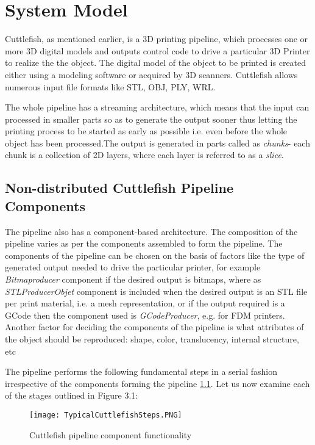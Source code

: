 \chapter{System Model}
Cuttlefish, as mentioned earlier, is a 3D printing pipeline, which processes one or more 3D digital models and outputs control code to drive a particular 3D Printer to realize the the object. The digital model of the object to be printed is created either using a modeling software or acquired by 3D scanners. Cuttlefish allows  numerous input file formats like STL, OBJ, PLY, WRL. 

The whole pipeline has a streaming architecture, which means that the input can processed in smaller parts so as to generate the output sooner thus letting the printing process to be started as early as possible i.e. even before the whole object has been processed.The output is generated in parts called as \textit{chunks}- each chunk is a collection of 2D layers, where each layer is referred to as a \textit{slice}. \newline

\section{Non-distributed Cuttlefish Pipeline Components}

The pipeline also has a component-based architecture. The composition of the pipeline varies as per the components assembled to form the pipeline. The components of the pipeline can be chosen on the basis of factors like the type of generated output needed to drive the particular printer, for example \textit{Bitmaproducer} component if the desired output is bitmaps, where as \textit{STLProducerObjet} component is included when the desired output is an STL file per print material, i.e. a mesh representation, or if the output required is a GCode then the component used is \textit{GCodeProducer}, e.g. for FDM printers. Another factor for deciding the components of the pipeline is what attributes of the object should be reproduced: shape, color, translucency, internal structure, etc
\newline

The pipeline performs the following fundamental steps in a serial fashion irrespective of the components forming the pipeline \ref{fig:TypicalCuttlefishSteps}. Let us now examine each of the stages outlined in Figure 3.1:

\begin{figure}[ht!]
\texttt{[image: TypicalCuttlefishSteps.PNG]}
\caption{Cuttlefish pipeline component functionality}
\label{fig:TypicalCuttlefishSteps}
\end{figure}

